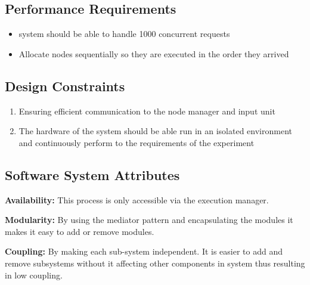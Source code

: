 \subsection{Performance Requirements}
\begin{itemize}
	\item system should be able to handle 1000 concurrent requests 
	\item Allocate nodes sequentially so they are executed in the order they arrived
\end{itemize}
\subsection{Design Constraints}
\begin{enumerate}
	\item Ensuring efficient communication to the node manager and input unit
	
	\item The hardware of the system should be able run in an isolated environment and continuously perform to the requirements of the experiment 
\end{enumerate}
\subsection{Software System Attributes}
{ 
    \begin{flushleft}
    \par\textbf{Availability: }This process is only accessible via the execution manager.\newline
    
    \par\textbf{Modularity: }By using the mediator pattern and encapsulating the modules it makes it easy to add or remove modules.\newline
  
    \par\textbf{Coupling: }By making each sub-system independent. It is easier to add and remove subsystems without it affecting other components in system thus resulting in low coupling. \newline
    \end{flushleft}
    
}


